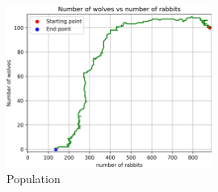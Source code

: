 \documentclass[unicode,11pt,a4paper,oneside,numbers=endperiod,openany]{scrartcl}
\begin{document}
\begin{figure}[H]
  \centering
  \includegraphics[width=0.6\textwidth]{output_main/PointAnew_populations.png}
  \caption{Population} 
\end{figure}
\end{document}
